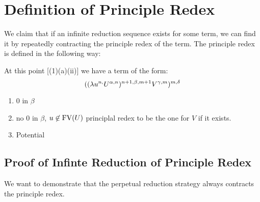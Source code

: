 \section{Definition of Principle Redex}
We claim that if an infinite reduction sequence exists for some term, we can find it by repeatedly contracting the principle redex of the term. The principle redex is defined in the following way:

At this point [(1)(a)(ii)] we have a term of the form:
\begin{equation*}
  ((\lambda u^{n,}U^{\alpha,n})^{n+1,\beta,m+1}V^{\gamma,m})^{m,\delta}
\end{equation*}

\begin{enumerate}[(1)]
  \item 0 in $\beta$
  \item no $0$ in $\beta$, $u \not\in \hbox{FV}(U)$ principlal redex to be the one for $V$ if it exists.
  \item Potential
\end{enumerate}

\subsection{Proof of Infinte Reduction of Principle Redex}
We want to demonstrate that the perpetual reduction strategy always contracts the principle redex.\\

